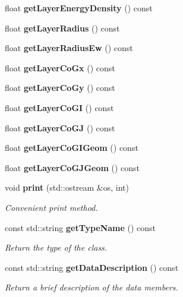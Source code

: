 \begin{DoxyCompactItemize}
\item 
float {\bfseries get\-Layer\-Energy\-Density} () const \label{classCALICE_1_1LayerVariables_a390cdcaee6bd9501c14b296198b29ca2}

\item 
float {\bfseries get\-Layer\-Radius} () const \label{classCALICE_1_1LayerVariables_afbcd8e8e87c3006e9ba1078d631806f2}

\item 
float {\bfseries get\-Layer\-Radius\-Ew} () const \label{classCALICE_1_1LayerVariables_a0b5371aaa5129aa1e9570ed0c8432e31}

\item 
float {\bfseries get\-Layer\-Co\-Gx} () const \label{classCALICE_1_1LayerVariables_a623e52b8610ceccc223d6e7064b8eeda}

\item 
float {\bfseries get\-Layer\-Co\-Gy} () const \label{classCALICE_1_1LayerVariables_a0337c588ea7e2195637c3b1cfcf2aebf}

\item 
float {\bfseries get\-Layer\-Co\-G\-I} () const \label{classCALICE_1_1LayerVariables_a6dfbc3a780e11da64bb2881fd5330079}

\item 
float {\bfseries get\-Layer\-Co\-G\-J} () const \label{classCALICE_1_1LayerVariables_a67bbee70a4d0e70b55fffc8ed48492e2}

\item 
float {\bfseries get\-Layer\-Co\-G\-I\-Geom} () const \label{classCALICE_1_1LayerVariables_a2e66a1fba3a2264b3c487fcd7cd8f814}

\item 
float {\bfseries get\-Layer\-Co\-G\-J\-Geom} () const \label{classCALICE_1_1LayerVariables_a84bd2cc6b765003dbd9d610cbd414e0f}

\item 
void {\bf print} (std\-::ostream \&os, int)\label{classCALICE_1_1LayerVariables_a501c4e7a07d0ae6af06e3621196f4dc3}

\begin{DoxyCompactList}\small\item\em Convenient print method. \end{DoxyCompactList}\item 
const std\-::string {\bf get\-Type\-Name} () const \label{classCALICE_1_1LayerVariables_a8bba4942054d9c4f1fc58e3cf5507810}

\begin{DoxyCompactList}\small\item\em Return the type of the class. \end{DoxyCompactList}\item 
const std\-::string {\bf get\-Data\-Description} () const \label{classCALICE_1_1LayerVariables_af73b008424dca115f0ad99b4014ba658}

\begin{DoxyCompactList}\small\item\em Return a brief description of the data members. \end{DoxyCompactList}\end{DoxyCompactItemize}


